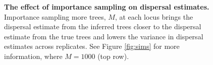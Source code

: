 \documentclass[12pt]{article}
\begin{document}
\begin{figure}[!htb]
\begin{center}

\end{center}

\caption{
\textbf{The effect of importance sampling on dispersal estimates.}
Importance sampling more trees, $M$, at each locus brings the dispersal estimate from the inferred trees closer to the dispersal estimate from the true trees and lowers the variance in dispersal estimates across replicates. See Figure \ref{fig:sims} for more information, where $M=1000$ (top row).
}

\label{fig:sup_sigma_imp}
\end{figure}


  

  
  
\end{document}
